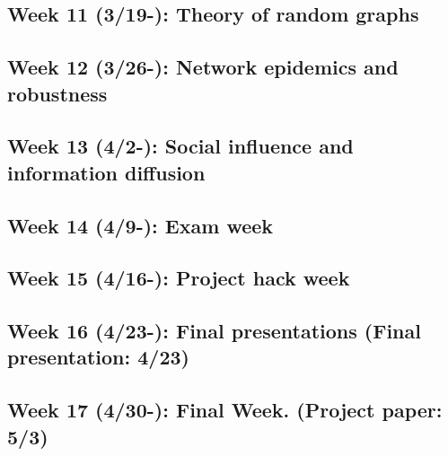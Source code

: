 \documentclass[11pt,article,oneside]{memoir} %
\begin{document}
\subsection{Week 11 (3/19-): Theory of random graphs}
\subsection{Week 12 (3/26-): Network epidemics and robustness}
\subsection{Week 13 (4/2-): Social influence and information diffusion}
\subsection{Week 14 (4/9-): Exam week}
\subsection{Week 15 (4/16-): Project hack week}
\subsection{Week 16 (4/23-): Final presentations (Final presentation: 4/23)}
\subsection{Week 17 (4/30-): Final Week. (Project paper: 5/3)}

\end{document}

